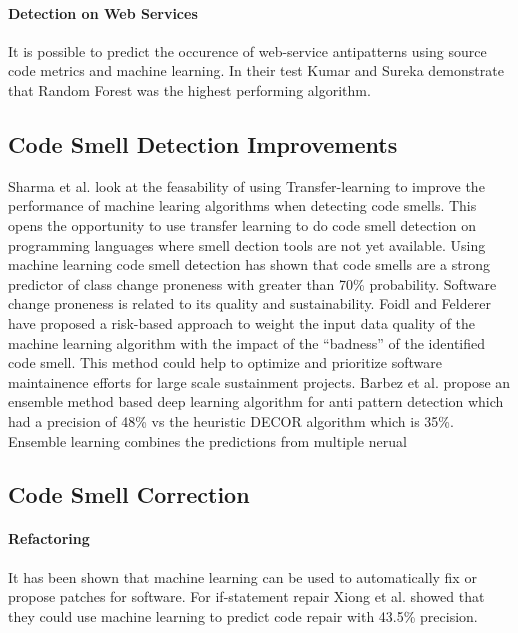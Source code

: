\documentclass[conference]{IEEEtran}
\begin{document}
\paragraph{Detection on Web Services}
It is possible to predict the occurence of web-service antipatterns using source code metrics and machine learning\cite{kumar_empirical_2018}. In their test Kumar and Sureka demonstrate that Random Forest was the highest performing algorithm.

\subsection{Code Smell Detection Improvements}
Sharma et al.\cite{sharma_feasibility_2019} look at the feasability of using Transfer-learning to improve the performance of machine learing algorithms when detecting code smells. This opens the opportunity to use transfer learning to do code smell detection on programming languages where smell dection tools are not yet available.
Using machine learning code smell detection has shown that code smells are a strong predictor of class change proneness\cite{pritam_assessment_2019} with greater than 70\% probability. Software change proneness is related to its quality and sustainability.
Foidl and Felderer have proposed\cite{foidl_risk-based_2019} a risk-based approach to weight the input data quality of the machine learning algorithm with the impact of the ``badness'' of the identified code smell. 
This method could help to optimize and prioritize software maintainence efforts for large scale sustainment projects.
Barbez et al. propose\cite{barbez_machine-learning_2019} an ensemble method based deep learning algorithm for anti pattern detection which had a precision of 48\% vs the heuristic DECOR algorithm which is 35\%. Ensemble learning combines the predictions from multiple nerual

\subsection{Code Smell Correction}

\paragraph{Refactoring} It has been shown that machine learning can be used to automatically fix or propose patches for software\cite{xiong_learning_2018}. For if-statement repair Xiong et al. showed that they could use machine learning to predict code repair with 43.5\% precision.
\end{document}
